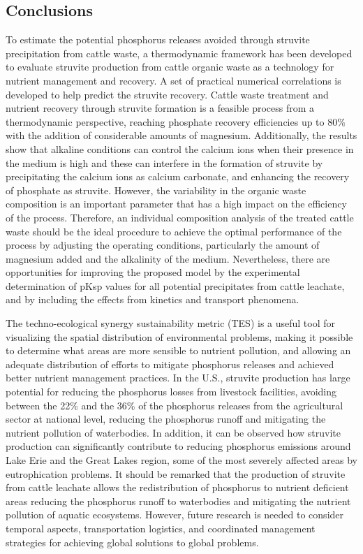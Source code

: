 \begin{refsection}[referencesCh3]
\section{Conclusions}
To estimate the potential phosphorus releases avoided through struvite precipitation from cattle waste, a thermodynamic framework has been developed to evaluate struvite production from cattle organic waste as a technology for nutrient management and recovery. A set of practical numerical correlations is developed to help predict the struvite recovery. Cattle waste treatment and nutrient recovery through struvite formation is a feasible process from a thermodynamic perspective, reaching phosphate recovery efficiencies up to 80\% with the addition of considerable amounts of magnesium. Additionally, the results show that alkaline conditions can control the calcium ions when their presence in the medium is high and these can interfere in the formation of struvite by precipitating the calcium ions as calcium carbonate, and enhancing the recovery of phosphate as struvite. However, the variability in the organic waste composition is an important parameter that has a high impact on the efficiency of the process. Therefore, an individual composition analysis of the treated cattle waste should be the ideal procedure to achieve the optimal performance of the process by adjusting the operating conditions, particularly the amount of magnesium added and the alkalinity of the medium. Nevertheless, there are opportunities for improving the proposed model by the experimental determination of pKsp values for all potential precipitates from cattle leachate, and by including the effects from kinetics and transport phenomena. 

The techno-ecological synergy sustainability metric (TES) is a useful tool for visualizing the spatial distribution of environmental problems, making it possible to determine what areas are  more sensible to nutrient pollution, and allowing an adequate distribution of efforts to mitigate phosphorus releases and achieved better nutrient management practices. In the U.S., struvite production has large potential for reducing the phosphorus losses from livestock facilities, avoiding between the 22\% and the 36\% of the phosphorus releases from the agricultural sector at national level, reducing the phosphorus runoff and mitigating the nutrient pollution of waterbodies. In addition, it can be observed how struvite production can significantly contribute to reducing phosphorus emissions around Lake Erie and the Great Lakes region, some of the most severely affected areas by eutrophication problems. It should be remarked that the production of struvite from cattle leachate allows the redistribution of phosphorus to nutrient deficient areas reducing the phosphorus runoff to waterbodies and mitigating the nutrient pollution of aquatic ecosystems. However, future research is needed to consider temporal aspects, transportation logistics, and coordinated management strategies for achieving global solutions to global problems. 


\end{refsection}
